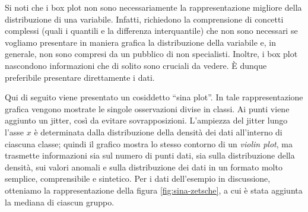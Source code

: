 \documentclass[
  10pt,
  italian,
  a4paper,
  extrafontsizes,onecolumn,openright
  ]{memoir}
\theoremstyle{definition}
\theoremstyle{definition}
\theoremstyle{definition}
\theoremstyle{definition}
\theoremstyle{remark}
\begin{document}
Si noti che i box plot non sono necessariamente la rappresentazione migliore della distribuzione di una variabile. Infatti, richiedono la comprensione di concetti complessi (quali i quantili e la differenza interquantile) che non sono necessari se vogliamo presentare in maniera grafica la distribuzione della variabile e, in generale, non sono compresi da un pubblico di non specialisti. Inoltre, i box plot nascondono informazioni che di solito sono cruciali da vedere. È dunque preferibile presentare direttamente i dati.

Qui di seguito viene presentato un cosiddetto ``sina plot''. In tale rappresentazione grafica vengono mostrate le singole osservazioni divise in classi. Ai punti viene aggiunto un jitter, così da evitare sovrapposizioni. L'ampiezza del jitter lungo l'asse \(x\) è determinata dalla distribuzione della densità dei dati all'interno di ciascuna classe; quindi il grafico mostra lo stesso contorno di un \emph{violin plot}, ma trasmette informazioni sia sul numero di punti dati, sia sulla distribuzione della densità, sui valori anomali e sulla distribuzione dei dati in un formato molto semplice, comprensibile e sintetico. Per i dati dell'esempio in discussione, otteniamo la rappresentazione della figura \ref{fig:sina-zetsche}, a cui è stata aggiunta la mediana di ciascun gruppo.
\end{document}
